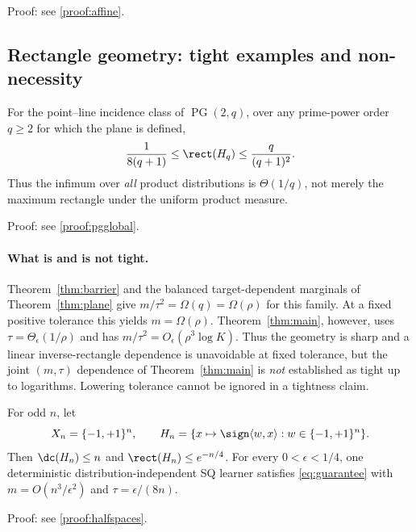 \noindent Proof: see \cref{proof:affine}.\par


\subsection{Rectangle geometry: tight examples and non-necessity}\label{sec:landscape}

\begin{theorem}\label{thm:pgglobal}
For the point--line incidence class of $\operatorname{PG}(2,q)$, over any prime-power order $q\ge2$ for which the plane is defined,
\[
 \frac1{8(q+1)}\le\rect(H_q)\le\frac{q}{(q+1)^2}.
\]
Thus the infimum over \emph{all} product distributions is $\Theta(1/q)$, not merely the maximum rectangle under the uniform product measure.
\end{theorem}

\noindent Proof: see \cref{proof:pgglobal}.\par


\paragraph{What is and is not tight.}
Theorem~\ref{thm:barrier} and the balanced target-dependent marginals of Theorem~\ref{thm:plane} give $m/\tau^2=\Omega(q)=\Omega(\rho)$ for this family. At a fixed positive tolerance this yields $m=\Omega(\rho)$. Theorem~\ref{thm:main}, however, uses $\tau=\Theta_\epsilon(1/\rho)$ and has $m/\tau^2=O_\epsilon(\rho^3\log K)$. Thus the geometry is sharp and a linear inverse-rectangle dependence is unavoidable at fixed tolerance, but the joint $(m,\tau)$ dependence of Theorem~\ref{thm:main} is \emph{not} established as tight up to logarithms. Lowering tolerance cannot be ignored in a tightness claim.


\begin{theorem}\label{thm:halfspaces}
For odd $n$, let
\[
 X_n=\{-1,+1\}^n,\qquad
 H_n=\{x\mapsto\sign\langle w,x\rangle:w\in\{-1,+1\}^n\}.
\]
Then $\dc(H_n)\le n$ and $\rect(H_n)\le e^{-n/4}$. For every $0<\epsilon<1/4$, one deterministic distribution-independent SQ learner satisfies \eqref{eq:guarantee} with $m=O(n^3/\epsilon^2)$ and $\tau=\epsilon/(8n)$.
\end{theorem}

\noindent Proof: see \cref{proof:halfspaces}.\par


